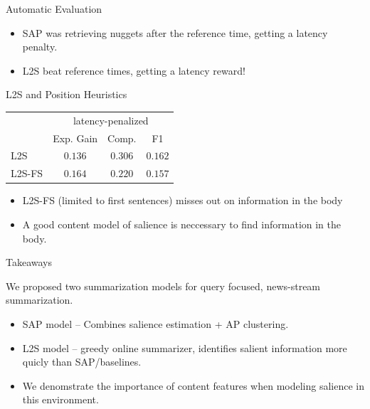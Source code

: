 \begin{frame}{Automatic Evaluation}
\begin{itemize}
\item<2-> SAP was retrieving nuggets after the reference time, getting a latency penalty.
\item<3-> L2S beat reference times, getting a latency reward!

\end{itemize}
\end{frame}

\begin{frame}{L2S and Position Heuristics}

\begin{center}
  \begin{tabular}{ l   c c c  }
\toprule
    &\multicolumn{3}{c}{latency-penalized}\\
\cmidrule(lr){2-4}
    & Exp. Gain    & Comp. & F1 \\
    \midrule
     \textsc{L2S}  & $0.136$ & \alert{$0.306$} & $0.162$ \\
     \textsc{L2S-FS}  & $0.164$ & \alert{$0.220$} & $0.157$ \\
\bottomrule
  \end{tabular}
\end{center}

\begin{itemize}
\item L2S-FS (limited to first sentences) misses out on information in the body
\item<2> A good content model of salience is neccessary to find information in the body.
\end{itemize}


\end{frame}

\begin{frame}{Takeaways}

 We proposed two summarization models for query focused, news-stream summarization.
\begin{itemize}
                    \item SAP model -- Combines salience estimation + AP clustering.
\vspace{5pt}

                    \item L2S model -- greedy online summarizer, identifies salient information more quicly than SAP/baselines.

\vspace{5pt}
                    \item We denomstrate the importance of content features 
when modeling salience in this environment.
                \end{itemize}




\end{frame}
